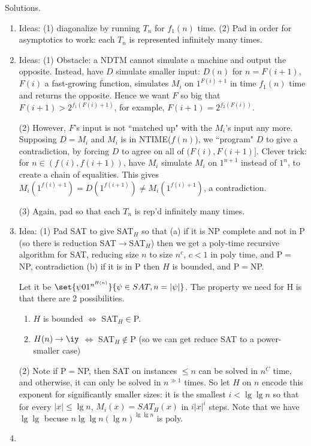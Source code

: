 Solutions.
\begin{enumerate}
\item
Ideas: (1) diagonalize by running $T_n$ for $f_1(n)$ time. (2) Pad in order for asymptotics to work: each $T_n$ is represented infinitely many times.
\item
Ideas: (1) Obstacle: a NDTM cannot simulate a machine and output the opposite. Instead, have $D$ simulate smaller input: $D(n)$ for $n=F(i+1)$, $F(i)$ a fast-growing function, simulates $M_i$ on $1^{F(i)+1}$ in time $f_1(n)$ time and returns the opposite. Hence we want $F$ so big that $F(i+1)>2^{f_1(F(i)+1)}$, for example, $F(i+1)=2^{f_2(F(i))}$.

(2) However, $F$'s input is not ``matched up" with the $M_i$'s input any more. Supposing $D=M_i$ and $M_i$ is in NTIME($f(n)$), we ``program" $D$ to give a contradiction, by forcing $D$ to agree on all of $(F(i),F(i+1)]$. Clever trick: for $n\in (f(i),f(i+1))$, have $M_i$ simulate $M_i$ on $1^{n+1}$ instead of $1^n$, to create a chain of equalities. This gives $M_i(1^{f(i)+1})=D(1^{f(i+1)})\ne M_i(1^{f(i)+1})$, a contradiction.

(3) Again, pad so that each $T_n$ is rep'd infinitely many times.
\item
Idea: (1) Pad SAT to give SAT${}_H$ so that (a) if it is NP complete and not in P (so there is reduction SAT$\to$SAT${}_H$) then we get a poly-time recursive algorithm for SAT, reducing size $n$ to size $n^c$, $c<1$ in poly time, and P$=$NP, contradiction (b) if it is in P then $H$ is bounded, and P$=$NP.

Let it be $\set{\psi 01^{n^{H(n)}}}{\psi\in SAT, n=|\psi|}$. The property we need for H is that there are 2 possibilities.
\begin{enumerate}
\item
$H$ is bounded $\iff$ SAT${}_H\in $P.
\item
$H(n)\to \iy$ $\iff$ SAT${}_H\nin $P (so we can get reduce SAT to a power-smaller case)
\end{enumerate}

(2) Note if P$=$NP, then SAT on instances $\le n$ can be solved in $n^C$ time, and otherwise, it can only be solved in $n^{\gg 1}$ times. So let $H$ on $n$ encode this exponent for significantly smaller sizes: it is the smallest $i<\lg\lg n$ so that for every $|x|\le \lg n$, $M_i(x)=SAT_H(x)$ in $i|x|^i$ steps. Note that we have $\lg\lg$ becuse $n\lg\lg n(\lg n)^{\lg\lg n}$ is poly.
\item
\end{enumerate}
